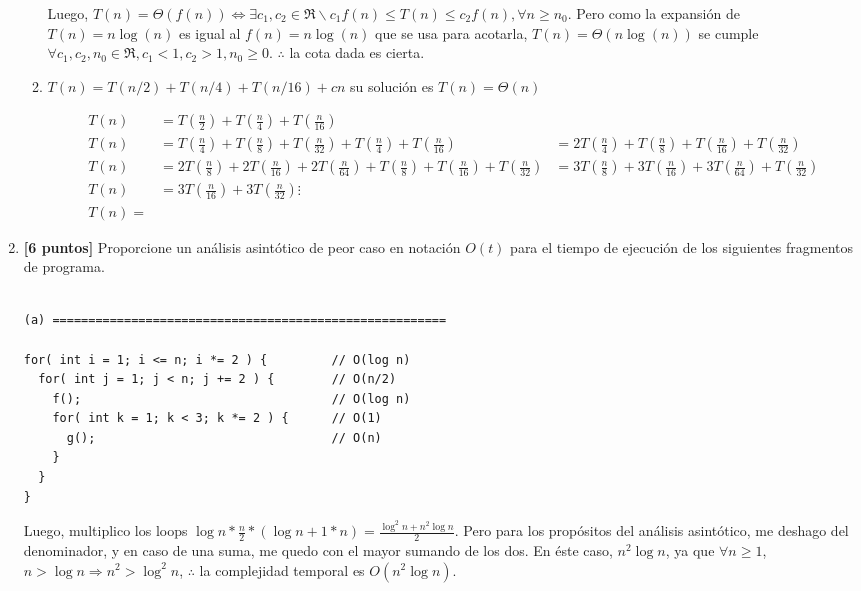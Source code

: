 \documentclass[10pt]{article}
\begin{document}
\begin{enumerate}
\begin{enumerate}
	Luego, $T(n)=\Theta(f(n)) \Leftrightarrow{} \exists c_1, c_2 \in \Re \backslash c_1 f(n) \leq T(n) \leq c_2 f(n), \forall n \geq n_0 $. Pero como la expansión de $T(n)=n\log(n)$ es igual al $f(n)=n\log(n)$ que se usa para acotarla, $T(n)=\Theta(n\log(n))$ se cumple $\forall c_1, c_2, n_0 \in \Re, c_1 < 1, c_2 > 1, n_0 \geq 0$. $\therefore$ la cota dada es cierta. 

  \item $T(n) = T(n/2) + T(n/4) + T(n/16) +cn$ su solución es $T(n) = \Theta(n)$
  
  \begin{align*}
  	T(n) &= T(\frac{n}{2}) + T(\frac{n}{4}) + T(\frac{n}{16}) \\
  	T(n) &= T(\frac{n}{4}) + T(\frac{n}{8}) + T(\frac{n}{32}) + T(\frac{n}{4}) + T(\frac{n}{16}) &= 2T(\frac{n}{4}) + T(\frac{n}{8}) + T(\frac{n}{16}) + T(\frac{n}{32}) \\
  	T(n) &= 2T(\frac{n}{8}) + 2T(\frac{n}{16}) + 2T(\frac{n}{64}) + T(\frac{n}{8}) + T(\frac{n}{16}) + T(\frac{n}{32}) &= 3T(\frac{n}{8}) + 3T(\frac{n}{16}) + 3T(\frac{n}{64}) + T(\frac{n}{32}) \\
  	T(n) &= 3T(\frac{n}{16}) + 3T(\frac{n}{32})
  	\vdots \\
  	T(n) = 
  \end{align*}
\end{enumerate}


\item \textbf{[6 puntos]} Proporcione un análisis asintótico de peor caso en notación $O(t)$ para el tiempo de ejecución de los siguientes fragmentos de programa.

\begin{verbatim}

(a) =======================================================

for( int i = 1; i <= n; i *= 2 ) {         // O(log n)
  for( int j = 1; j < n; j += 2 ) {        // O(n/2)
    f();                                   // O(log n)
    for( int k = 1; k < 3; k *= 2 ) {      // O(1)
      g();                                 // O(n)
    }
  }
}
\end{verbatim}

Luego, multiplico los loops $\log n * \frac{n}{2} * (\log n + 1 * n) = \frac{\log^2 n + n^2\log n}{2}$. Pero para los propósitos del análisis asintótico, me deshago del denominador, y en caso de una suma, me quedo con el mayor sumando de los dos. En éste caso, $n^2 \log n$, ya que $\forall n \geq 1$, $n > \log n \Rightarrow n^2 > \log^2 n $, $\therefore$ la complejidad temporal es $O(n^2 \log n)$.


\end{enumerate}
\end{document}

